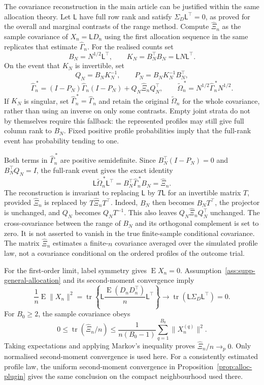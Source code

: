 \documentclass[12pt,a4paper]{article}
\theoremstyle{definition}
\theoremstyle{remark}\newtheorem{remark}{Remark}
\numberwithin{equation}{section}
\newcommand{\E}{\operatorname{E}}
\begin{document}
The covariance reconstruction in the main article can be justified within the same allocation theory. Let $\mathsf L$ have full row rank and satisfy $\Sigma_D\mathsf L^\top=0$, as proved for the overall and marginal contrasts of the range method. Compute $\widehat\Xi_n$ as the sample covariance of $X_n=\mathsf L D_n$ using the first allocation sequence in the same replicates that estimate $\widehat\Gamma_n$. For the realised counts set
\[
 B_N=N^{1/2}\mathsf L^\top,\qquad
 K_N=B_N^\top B_N=\mathsf L N\mathsf L^\top.
\]
On the event that $K_N$ is invertible, set
\[
 Q_N=B_NK_N^{-1},\qquad P_N=B_NK_N^{-1}B_N^\top,
\]
\[
 \widehat\Gamma_n^{\,*}
 =(I-P_N)\widehat\Gamma_n(I-P_N)+Q_N\widehat\Xi_nQ_N^\top,
 \qquad
 \widetilde\Omega_n^{\,*}=N^{1/2}\widehat\Gamma_n^{\,*}N^{1/2}.
\]
If $K_N$ is singular, set $\widehat\Gamma_n^{\,*}=\widehat\Gamma_n$ and retain the original $\widetilde\Omega_n$ for the whole covariance, rather than using an inverse on only some contrasts. Empty joint strata do not by themselves require this fallback: the represented profiles may still give full column rank to $B_N$. Fixed positive profile probabilities imply that the full-rank event has probability tending to one.

Both terms in $\widehat\Gamma_n^{\,*}$ are positive semidefinite. Since $B_N^\top(I-P_N)=0$ and $B_N^\top Q_N=I$, the full-rank event gives the exact identity
\[
 \mathsf L\widetilde\Omega_n^{\,*}\mathsf L^\top
 =B_N^\top\widehat\Gamma_n^{\,*}B_N=\widehat\Xi_n.
\]
The reconstruction is invariant to replacing $\mathsf L$ by $T\mathsf L$ for an invertible matrix $T$, provided $\widehat\Xi_n$ is replaced by $T\widehat\Xi_nT^\top$. Indeed, $B_N$ then becomes $B_NT^\top$, the projector is unchanged, and $Q_N$ becomes $Q_NT^{-1}$. This also leaves $Q_N\widehat\Xi_nQ_N^\top$ unchanged. The cross-covariance between the range of $B_N$ and its orthogonal complement is set to zero. It is not asserted to vanish in the true finite-sample conditional covariance. The matrix $\widehat\Xi_n$ estimates a finite-$n$ covariance averaged over the simulated profile law, not a covariance conditional on the ordered profiles of the outcome trial.

For the first-order limit, label symmetry gives $\E X_n=0$. Assumption~\ref{ass:supp-general-allocation} and its second-moment convergence imply
\[
 \frac1n\E\|X_n\|^2
 =\operatorname{tr}\left\{\mathsf L\frac{\E(D_nD_n^\top)}n\mathsf L^\top\right\}
 \longrightarrow\operatorname{tr}(\mathsf L\Sigma_D\mathsf L^\top)=0.
\]
For $B_0\ge2$, the sample covariance obeys
\[
 0\le\operatorname{tr}(\widehat\Xi_n/n)
 \le\frac1{n(B_0-1)}\sum_{q=1}^{B_0}\|X_n^{(q)}\|^2.
\]
Taking expectations and applying Markov's inequality proves $\widehat\Xi_n/n\to_p0$. Only normalised second-moment convergence is used here. For a consistently estimated profile law, the uniform second-moment convergence in Proposition~\ref{prop:alloc-plugin} gives the same conclusion on the compact neighbourhood used there.
\end{document}
